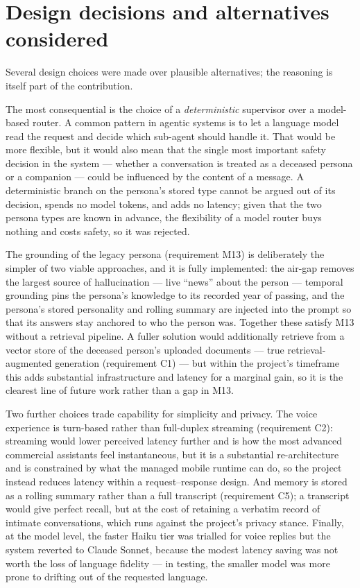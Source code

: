 \documentclass[11pt,a4paper]{report}
\begin{document}
\section{Design decisions and alternatives considered}
\label{sec:decisions}
Several design choices were made over plausible alternatives; the reasoning is itself part of the contribution.

The most consequential is the choice of a \emph{deterministic} supervisor over a model-based router. A common pattern in agentic systems is to let a language model read the request and decide which sub-agent should handle it. That would be more flexible, but it would also mean that the single most important safety decision in the system --- whether a conversation is treated as a deceased persona or a companion --- could be influenced by the content of a message. A deterministic branch on the persona's stored type cannot be argued out of its decision, spends no model tokens, and adds no latency; given that the two persona types are known in advance, the flexibility of a model router buys nothing and costs safety, so it was rejected.

The grounding of the legacy persona (requirement M13) is deliberately the simpler of two viable approaches, and it is fully implemented: the air-gap removes the largest source of hallucination --- live ``news'' about the person --- temporal grounding pins the persona's knowledge to its recorded year of passing, and the persona's stored personality and rolling summary are injected into the prompt so that its answers stay anchored to who the person was. Together these satisfy M13 without a retrieval pipeline. A fuller solution would additionally retrieve from a vector store of the deceased person's uploaded documents --- true retrieval-augmented generation (requirement C1) \cite{lewis2020retrieval} --- but within the project's timeframe this adds substantial infrastructure and latency for a marginal gain, so it is the clearest line of future work rather than a gap in M13.

Two further choices trade capability for simplicity and privacy. The voice experience is turn-based rather than full-duplex streaming (requirement C2): streaming would lower perceived latency further and is how the most advanced commercial assistants feel instantaneous, but it is a substantial re-architecture and is constrained by what the managed mobile runtime can do, so the project instead reduces latency within a request--response design. And memory is stored as a rolling summary rather than a full transcript (requirement C5); a transcript would give perfect recall, but at the cost of retaining a verbatim record of intimate conversations, which runs against the project's privacy stance. Finally, at the model level, the faster Haiku tier was trialled for voice replies but the system reverted to Claude Sonnet, because the modest latency saving was not worth the loss of language fidelity --- in testing, the smaller model was more prone to drifting out of the requested language.
\end{document}
